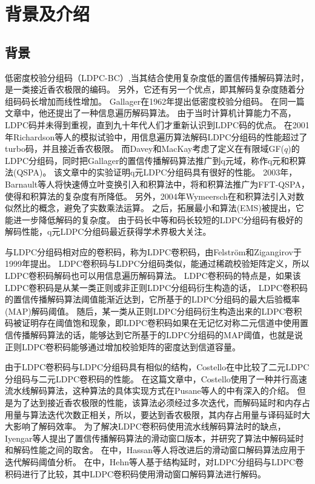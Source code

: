 \chapter{背景及介绍}
\section{背景}
低密度校验分组码（LDPC-BC）,当其结合使用复杂度低的置信传播解码算法时，是一类接近香农极限的编码。
另外，它还有另一个优点，即其解码复杂度随着分组码码长增加而线性增加。
Gallager在1962年提出低密度校验分组码\parencite{1057683}。
在同一篇文章中，他还提出了一种信息遍历解码算法。
由于当时计算机计算能力不高，LDPC码并未得到重视，直到九十年代人们才重新认识到LDPC码的优点。
在2001年Richardson等人的模拟试验中\parencite{910578}，用信息遍历算法解码LDPC分组码的性能超过了turbo码，并且接近香农极限。
而Davey和MacKay考虑了定义在有限域GF($q$)的LDPC分组码\parencite{681360}，同时把Gallager的置信传播解码算法推广到q元域，称作q元和积算法(QSPA)。
该文章中的实验证明q元LDPC分组码具有很好的性能。
2003年，Barnault等人将快速傅立叶变换引入和积算法中，将和积算法推广为FFT-QSPA，使得和积算法的复杂度有所降低\parencite{1216697}。
另外，2004年Wymeersch在和积算法引入对数似然比的概念，避免了实数乘法运算\parencite{1312606}。
之后，拓展最小和算法(EMS)被提出，它能进一步降低解码的复杂度。
由于码长中等和码长较短的LDPC分组码有极好的解码性能，q元LDPC分组码最近获得学术界极大关注。

与LDPC分组码相对应的卷积码，称为LDPC卷积码，由Felström和Zigangirov\parencite{782171}于1999年提出。
LDPC卷积码与LDPC分组码类似，能通过稀疏校验矩阵定义，所以LDPC卷积码解码也可以用信息遍历解码算法。
LDPC卷积码的特点是，如果该LDPC卷积码是从某一类正则或非正则LDPC分组码衍生构造的话，
LDPC卷积码的置信传播解码算法阈值能渐近达到，它所基于的LDPC分组码的最大后验概率(MAP)解码阈值\parencite{5695130}。
随后，某一类从正则LDPC分组码衍生构造出来的LDPC卷积码被证明存在阈值饱和现象，即LDPC卷积码如果在无记忆对称二元信道中使用置信传播解码算法的话，能够达到它所基于的LDPC分组码的MAP阈值，也就是说正则LDPC卷积码能够通过增加校验矩阵的密度达到信道容量。

由于LDPC卷积码与LDPC分组码具有相似的结构，Costello在\parencite{4357569}中比较了二元LDPC分组码与二元LDPC卷积码的性能。
在这篇文章中，Costello使用了一种并行高速流水线解码算法，这种算法的具体实现方式在Pusane等人的\parencite{4568447}中有深入的介绍。
但是为了达到接近香农极限的性能，该算法必须经过多次迭代，而解码延时和内存占用量与算法迭代次数正相关，所以，要达到香农极限，其内存占用量与译码延时大大影响了解码效率。
为了解决LDPC卷积码使用流水线解码算法时的缺点，Iyengar等人提出了置信传播解码算法的滑动窗口版本\parencite{6086762}，并研究了算法中解码延时和解码性能之间的取舍。
在\parencite{6325232}中，Hassan等人将改进后的滑动窗口解码算法应用于迭代解码阈值分析。
在\parencite{5089507}中，Hehn等人基于结构延时，对LDPC分组码与LDPC卷积码进行了比较，其中LDPC卷积码使用滑动窗口解码算法进行解码。

